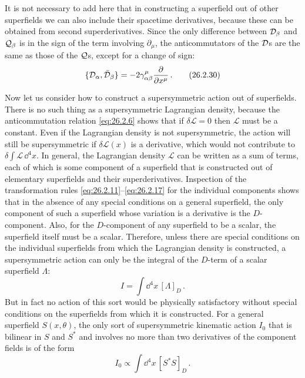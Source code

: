 It is not necessary to add here that in constructing a superfield out of other
superfields we can also include their spacetime derivatives, because these can
be obtained from second superderivatives. Since the only difference between
$\mathcal{D}_\beta$ and $\mathcal{Q}_\beta$ is in the sign of the term involving
$\partial_\mu$, the anticommutators of the $\mathcal{D}$s are the same as those of
the $\mathcal{Q}$s, except for a change of sign:
\begin{equation}
  \{\mathcal{D}_\alpha,\bar{\mathcal{D}}_\beta\}
  =-2\gamma^\mu_{\alpha\beta}\frac{\partial}{\partial x^\mu}\,.
  \tag{26.2.30}\label{eq:26.2.30}
\end{equation}

Now let us consider how to construct a supersymmetric action out of
superfields. There is no such thing as a supersymmetric Lagrangian density,
because the anticommutation relation \eqref{eq:26.2.6} shows that if
$\delta\mathcal{L}=0$ then $\mathcal{L}$ must be a constant. Even if the
Lagrangian density is not supersymmetric, the action will still be
supersymmetric if $\delta\mathcal{L}(x)$ is a derivative, which would not
contribute to $\delta\int\mathcal{L}\,\dd^4x$. In general, the Lagrangian
density $\mathcal{L}$ can be written as a sum of terms, each of which is some
component of a superfield that is constructed out of elementary superfields
and their superderivatives. Inspection of the transformation rules
\eqref{eq:26.2.11}--\eqref{eq:26.2.17} for the individual components shows
that in the absence of any special conditions on a general superfield, the
only component of such a superfield whose variation is a derivative is the
$D$-component. Also, for the $D$-component of any superfield to be a scalar,
the superfield itself must be a scalar. Therefore, unless there are special
conditions on the individual superfields from which the Lagrangian density is
constructed, a supersymmetric action can only be the integral of the
$D$-term of a scalar superfield $\Lambda$:
\begin{equation}
  I=\int \dd^4x\,[\Lambda]_D\,.
  \tag{26.2.31}\label{eq:26.2.31}
\end{equation}
But in fact no action of this sort would be physically satisfactory without
special conditions on the superfields from which it is constructed. For a
general superfield $S(x,\theta)$, the only sort of supersymmetric kinematic
action $I_0$ that is bilinear in $S$ and $S^*$ and involves no more than two
derivatives of the component fields is of the form
\begin{equation}
  I_0\mathrel{\propto}\int \dd^4x\,[S^*S]_D\,.
  \tag{26.2.32}\label{eq:26.2.32}
\end{equation}
